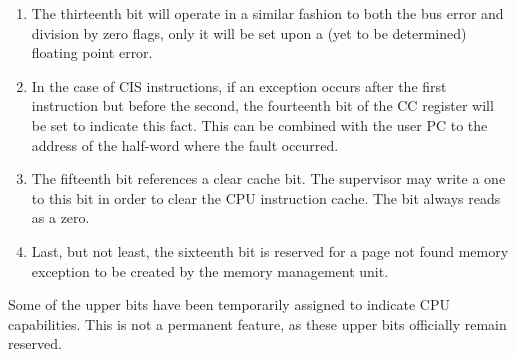 \documentclass{gqtekspec}
\begin{document}
\begin{enumerate}
\item The thirteenth bit will operate in a similar fashion to both the bus
	error and division by zero flags, only it will be set upon a (yet to
	be determined) floating point error.

\item In the case of CIS instructions, if an exception occurs after the first
	instruction but before the second, the fourteenth bit of the CC
	register will be set to indicate this fact.  This can be combined with
	the user PC to the address of the half-word where the fault occurred.

\item The fifteenth bit references a clear cache bit.  The supervisor may
	write a one to this bit in order to clear the CPU instruction cache. 
	The bit always reads as a zero.

\item Last, but not least, the sixteenth bit is reserved for a page not found
	memory exception to be created by the memory management unit.

\end{enumerate}

Some of the upper bits have been temporarily assigned to indicate CPU
capabilities.  This is not a permanent feature, as these upper bits officially
remain reserved.
\end{document}
